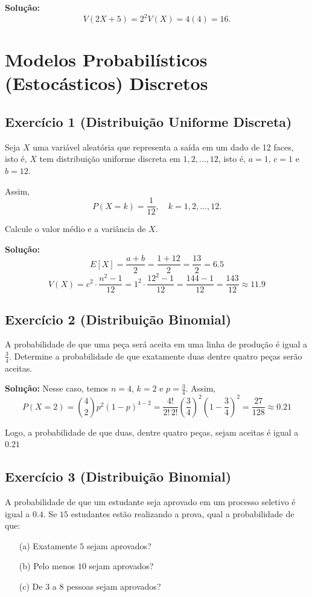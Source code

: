 \documentclass{article}
\begin{document}
\vspace{0.5cm}
\textbf{Solução:}
    $$
    V(2X + 5) = 2^2 V(X) = 4(4) = 16.
    $$

\section{Modelos Probabilísticos (Estocásticos) Discretos}
\subsection{Exercício 1 (Distribuição Uniforme Discreta)}
Seja $X$ uma variável aleatória que representa a saída em um dado de 12 faces, isto é, $X$ tem distribuição uniforme discreta em $1,2,\ldots,12$, isto é, $a = 1$, $c = 1$ e $b = 12$. 

Assim,  
    $$
    P(X = k) = \frac{1}{12}, \quad k = 1,2,\ldots,12.
    $$

Calcule o valor médio e a variância de $X$.

\vspace{0.5cm}
\textbf{Solução:}
    $$
    E[X] = \frac{a+b}{2} = \frac{1 + 12}{2} = \frac{13}{2} = 6.5
    $$
    $$
    V(X) = c^2 \cdot \frac{n^2 - 1}{12} 
          = 1^2 \cdot \frac{12^2 - 1}{12} 
          = \frac{144 - 1}{12} 
          = \frac{143}{12} \approx 11.9
    $$

\subsection{Exercício 2 (Distribuição Binomial)}
A probabilidade de que uma peça será aceita em uma linha de produção é igual a $\tfrac{3}{4}$. Determine a probabilidade de que exatamente duas dentre quatro peças serão aceitas.

\vspace{0.5cm}
\textbf{Solução:}
Nesse caso, temos $n = 4$, $k = 2$ e $p = \tfrac{3}{4}$. Assim,
    $$
    P(X = 2) = \binom{4}{2} p^2 (1-p)^{4-2} 
    = \frac{4!}{2! \, 2!} \left(\frac{3}{4}\right)^2 \left(1 - \frac{3}{4}\right)^2 
    = \frac{27}{128} \approx 0.21
    $$

Logo, a probabilidade de que duas, dentre quatro peças, sejam aceitas é igual a $0.21$

\subsection{Exercício 3 (Distribuição Binomial)}
A probabilidade de que um estudante seja aprovado em um processo seletivo é igual a $0.4$. Se $15$ estudantes estão realizando a prova, qual a probabilidade de que:  
\begin{enumerate}
    \item[(a)] Exatamente $5$ sejam aprovados?
    \item[(b)] Pelo menos $10$ sejam aprovados?
    \item[(c)] De $3$ a $8$ pessoas sejam aprovados?
\end{enumerate}
\end{document}
